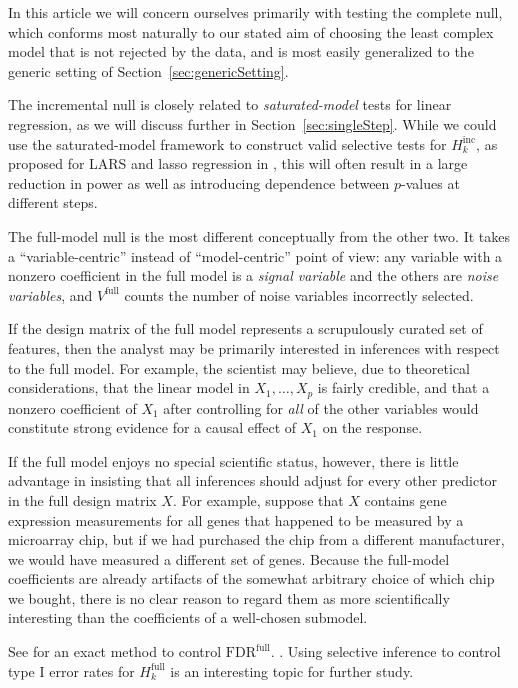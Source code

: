 \documentclass{article}
\begin{document}
In this article we will concern ourselves primarily with testing the complete null, which conforms most naturally to our stated aim of choosing the least complex model that is not rejected by the data, and is most easily generalized to the generic setting of Section~\ref{sec:genericSetting}. 

The incremental null is closely related to {\em saturated-model} tests for linear regression, as we will discuss further in Section~\ref{sec:singleStep}. While we could use the saturated-model framework to construct valid selective tests for $H_k^{\text{inc}}$, as proposed for LARS and lasso regression in \citet{taylor2014exact}, this will often result in a large reduction in power as well as introducing dependence between $p$-values at different steps. 

The full-model null is the most different conceptually from the other two. It takes a ``variable-centric'' instead of ``model-centric'' point of view: any variable with a nonzero coefficient in the full model is a {\em signal variable} and the others are {\em noise variables}, and $V^{\text{full}}$ counts the number of noise variables incorrectly selected. 

If the design matrix of the full model represents a scrupulously curated set of features, then the analyst may be primarily interested in inferences with respect to the full model. For example, the scientist may believe, due to theoretical considerations, that the linear model in $X_1, \ldots, X_p$ is fairly credible, and that a nonzero coefficient of $X_1$ after controlling for {\em all} of the other variables would constitute strong evidence for a causal effect of $X_1$ on the response. 

If the full model enjoys no special scientific status, however, there is little advantage in insisting that all inferences should adjust for every other predictor in the full design matrix $X$. For example, suppose that $X$ contains gene expression measurements for all genes that happened to be measured by a microarray chip, but if we had purchased the chip from a different manufacturer, we would have measured a different set of genes. Because the full-model coefficients are already artifacts of the somewhat arbitrary choice of which chip we bought, there is no clear reason to regard them as more scientifically interesting than the coefficients of a well-chosen submodel.

See \citet{barber2014controlling} for an exact method to control $\text{FDR}^{\text{full}}$. . Using selective inference to control type I error rates for $H_k^{\text{full}}$ is an interesting topic for further study.
\end{document}
